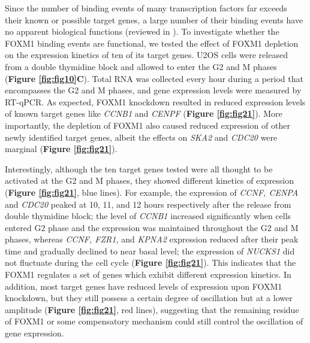 Since the number of binding events of many transcription factors far exceeds their known or possible target genes, a large number of their binding events have no apparent biological functions (reviewed in \cite{macquarrie2011genome-wide}). To investigate whether the FOXM1 binding events are functional, we tested the effect of FOXM1 depletion on the expression kinetics of ten of its target genes. U2OS cells were released from a double thymidine block and allowed to enter the G2 and M phases (\textbf{Figure \ref{fig:fig10}C}). Total RNA was collected every hour during a period that encompasses the G2 and M phases, and gene expression levels were measured by RT-qPCR. As expected, FOXM1 knockdown resulted in reduced expression levels of known target genes like \textit{CCNB1} and \textit{CENPF} (\textbf{Figure \ref{fig:fig21}}). More importantly, the depletion of FOXM1 also caused reduced expression of other newly identified target genes, albeit the effects on \textit{SKA2} and \textit{CDC20} were marginal (\textbf{Figure \ref{fig:fig21}}).

Interestingly, although the ten target genes tested were all thought to be activated at the G2 and M phases, they showed different kinetics of expression (\textbf{Figure \ref{fig:fig21}}, blue lines). For example, the expression of \textit{CCNF, CENPA} and \textit{CDC20} peaked at 10, 11, and 12 hours respectively after the release from double thymidine block; the level of \textit{CCNB1} increased significantly when cells entered G2 phase and the expression was maintained throughout the G2 and M phases, whereas \textit{CCNF, FZR1,} and \textit{KPNA2} expression reduced after their peak time and gradually declined to near basal level; the expression of \textit{NUCKS1} did not fluctuate during the cell cycle (\textbf{Figure \ref{fig:fig21}}). This indicates that the FOXM1 regulates a set of genes which exhibit different expression kinetics. In addition, most target genes have reduced levels of expression upon FOXM1 knockdown, but they still possess a certain degree of oscillation but at a lower amplitude (\textbf{Figure \ref{fig:fig21}}, red lines), suggesting that the remaining residue of FOXM1 or some compensatory mechanism could still control the oscillation of gene expression.

